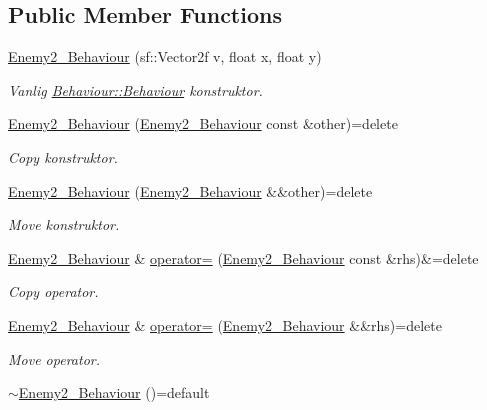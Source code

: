 \subsection*{Public Member Functions}
\begin{DoxyCompactItemize}
\item 
\hyperlink{classEnemy2__Behaviour_a8a829457bf290b7419955fa8c7808b49}{Enemy2\+\_\+\+Behaviour} (sf\+::\+Vector2f v, float x, float y)
\begin{DoxyCompactList}\small\item\em Vanlig \hyperlink{classBehaviour_a57e050961bc1305993adaeac62658657}{Behaviour\+::\+Behaviour} konstruktor. \end{DoxyCompactList}\item 
\hyperlink{classEnemy2__Behaviour_a12df4777ecea49697eeb5e0185d542dd}{Enemy2\+\_\+\+Behaviour} (\hyperlink{classEnemy2__Behaviour}{Enemy2\+\_\+\+Behaviour} const \&other)=delete
\begin{DoxyCompactList}\small\item\em Copy konstruktor. \end{DoxyCompactList}\item 
\hyperlink{classEnemy2__Behaviour_a17391bee40ff82bd774d0d910048f111}{Enemy2\+\_\+\+Behaviour} (\hyperlink{classEnemy2__Behaviour}{Enemy2\+\_\+\+Behaviour} \&\&other)=delete
\begin{DoxyCompactList}\small\item\em Move konstruktor. \end{DoxyCompactList}\item 
\hyperlink{classEnemy2__Behaviour}{Enemy2\+\_\+\+Behaviour} \& \hyperlink{classEnemy2__Behaviour_aefb93bb199ad534638ae950d6cdd3a24}{operator=} (\hyperlink{classEnemy2__Behaviour}{Enemy2\+\_\+\+Behaviour} const \&rhs)\&=delete
\begin{DoxyCompactList}\small\item\em Copy operator. \end{DoxyCompactList}\item 
\hyperlink{classEnemy2__Behaviour}{Enemy2\+\_\+\+Behaviour} \& \hyperlink{classEnemy2__Behaviour_a640e6d6829df6a9a5ddd14bad50d28a7}{operator=} (\hyperlink{classEnemy2__Behaviour}{Enemy2\+\_\+\+Behaviour} \&\&rhs)=delete
\begin{DoxyCompactList}\small\item\em Move operator. \end{DoxyCompactList}\item 
\hyperlink{classEnemy2__Behaviour_a42f92d6f39b1b14f758da506aaf4bc36}{$\sim$\+Enemy2\+\_\+\+Behaviour} ()=default

\end{DoxyCompactItemize}

